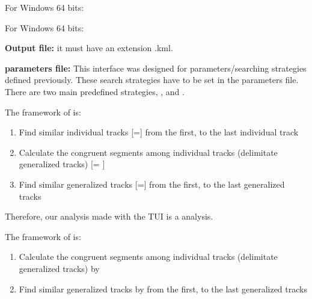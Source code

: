 %
%
%


For Windows 64 bits:



For Windows 64 bits:



\textbf{Output file:} it must have an extension .kml. 
\vspace{-7\baselineskip}
\vspace{7\baselineskip}


\textbf{parameters file:} This interface was designed for parameters/searching strategies defined previously. These search strategies have to be set in the parameters file. There are two main predefined strategies, , and .

\vspace{-7\baselineskip}
\vspace{7\baselineskip}




The framework of  is: 
\begin{enumerate}
 \item Find similar individual tracks [=] from the first, to the last individual track
 \item Calculate the congruent segments among individual tracks (delimitate generalized tracks) [= ]
 \item Find similar generalized tracks  [=] from the first, to the last generalized tracks
\end{enumerate}
Therefore, our analysis made with the TUI is a  analysis.


The framework of  is: 
\begin{enumerate}
 \item Calculate the congruent segments among individual tracks (delimitate generalized tracks) by 
 \item Find similar generalized tracks by  from the first, to the last generalized tracks
\end{enumerate}

